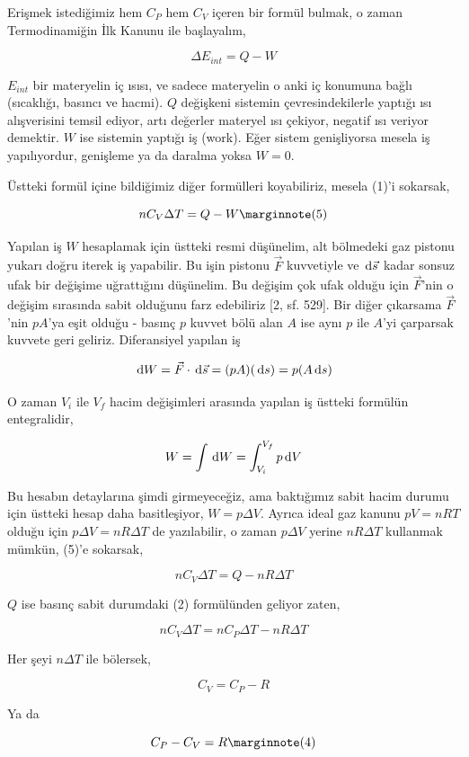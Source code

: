 \documentclass[12pt,fleqn]{article}\usepackage{../../common}
\begin{document}
Erişmek istediğimiz hem $C_P$ hem $C_V$ içeren bir formül bulmak, o zaman
Termodinamiğin İlk Kanunu ile başlayalım,

$$
\Delta E_{int} = Q - W
$$

$E_{int}$ bir materyelin iç ısısı, ve sadece materyelin o anki iç konumuna bağlı
(sıcaklığı, basıncı ve hacmi). $Q$ değişkeni sistemin çevresindekilerle yaptığı
ısı alışverisini temsil ediyor, artı değerler materyel ısı çekiyor, negatif ısı
veriyor demektir. $W$ ise sistemin yaptığı iş (work). Eğer sistem genişliyorsa
mesela iş yapılıyordur, genişleme ya da daralma yoksa $W=0$.

Üstteki formül içine bildiğimiz diğer formülleri koyabiliriz, mesela (1)'i
sokarsak,

$$
n C_V \Delta T = Q - W
\mlabel{5}
$$

Yapılan iş $W$ hesaplamak için üstteki resmi düşünelim, alt bölmedeki gaz
pistonu yukarı doğru iterek iş yapabilir. Bu işin pistonu $\vec{F}$ kuvvetiyle
ve $\,\mathrm{d} \vec{s}$ kadar sonsuz ufak bir değişime uğrattığını düşünelim.  Bu
değişim çok ufak olduğu için $\vec{F}$'nin o değişim sırasında sabit olduğunu
farz edebiliriz [2, sf. 529]. Bir diğer çıkarsama $\vec{F}$'nin $p A$'ya eşit
olduğu - basınç $p$ kuvvet bölü alan $A$ ise aynı $p$ ile $A$'yi çarparsak
kuvvete geri geliriz. Diferansiyel yapılan iş

$$
\,\mathrm{d} W = \vec{F} \cdot \,\mathrm{d} \vec{s} = (pA) (\,\mathrm{d} s) = p (A \,\mathrm{d} s)
$$

O zaman $V_i$ ile $V_f$ hacim değişimleri arasında yapılan iş üstteki formülün
entegralidir,

$$
W = \int \,\mathrm{d} W = \int_{V_i}^{V_f} p \,\mathrm{d} V
$$

Bu hesabın detaylarına şimdi girmeyeceğiz, ama baktığımız sabit hacim
durumu için üstteki hesap daha basitleşiyor, $W = p \Delta V$. Ayrıca
ideal gaz kanunu $pV = n R T$ olduğu için $p \Delta V = n R \Delta T$
de yazılabilir, o zaman $p \Delta V$ yerine $n R \Delta T$ kullanmak
mümkün, (5)'e sokarsak,

$$
n C_V \Delta T = Q - n R \Delta T
$$

$Q$ ise basınç sabit durumdaki (2) formülünden geliyor zaten,

$$
n C_V \Delta T = n C_P \Delta T - n R \Delta T
$$

Her şeyi $n \Delta T$ ile bölersek,

$$
C_V = C_P - R
$$

Ya da

$$
C_P - C_V = R
\mlabel{4}
$$
\end{document}
